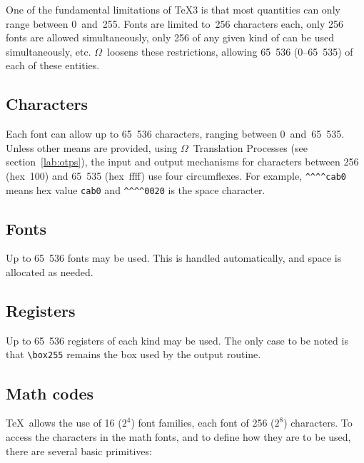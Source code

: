 \documentclass[fleqn]{article}
\newcommand{\OMEGA}{$\Omega$}
\begin{document}
One of the fundamental limitations of \TeX3 is that most quantities can
only range between 0~and~255.  Fonts are limited to~256 characters each,
only 256 fonts are allowed simultaneously, only 256 of any given kind of
can be used simultaneously, etc.  \OMEGA\ loosens these restrictions,
allowing 65~536 (0--65~535) of each of these entities.

\subsection{Characters}

Each font can allow up to 65~536 characters, ranging between
0~and~65~535.  Unless other means are provided, using \OMEGA\
Translation Processes (see section~\ref{lab:otps}), the input
and output mechanisms for characters between 256 (hex~100)
and 65~535 (hex~ffff) use four circumflexes.  For example,
\verb|^^^^cab0| means hex value \verb|cab0| and \verb|^^^^0020|
is the space character.

\subsection{Fonts}

Up to 65~536 fonts may be used.  This is handled automatically,
and space is allocated as needed.

\subsection{Registers}

Up to 65~536 registers of each kind may be used.  The only case to
be noted is that \verb|\box255| remains the box used by the output
routine.

\subsection{Math codes}

\TeX\ allows the use of 16 ($2^4$) font families, each font
of 256 ($2^8$) characters.
To access the characters in the math fonts, and to define how
they are to be used, there are several basic primitives:
\end{document}
